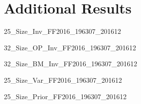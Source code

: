 
\section{Additional Results} \label{sec:addl_results}

{25_Size_Inv_FF2016_196307_201612}

\begin{landscape}
{32_Size_OP_Inv_FF2016_196307_201612}
\end{landscape}

\begin{landscape}
{32_Size_BM_Inv_FF2016_196307_201612}
\end{landscape}

{25_Size_Var_FF2016_196307_201612}

{25_Size_Prior_FF2016_196307_201612}
